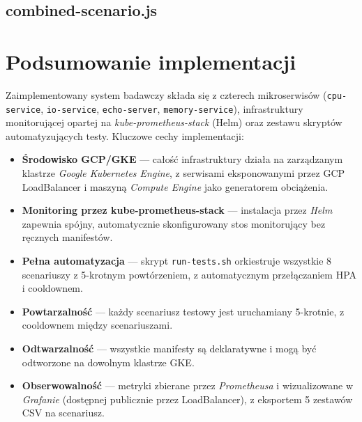 \subsection{combined-scenario.js}



\section{Podsumowanie implementacji}

Zaimplementowany system badawczy składa się z czterech mikroserwisów (\texttt{cpu-service}, \texttt{io-service}, \texttt{echo-server}, \texttt{memory-service}), infrastruktury monitorującej opartej na \textit{kube-prometheus-stack} (Helm) oraz zestawu skryptów automatyzujących testy. Kluczowe cechy implementacji:

\begin{itemize}
  \item \textbf{Środowisko GCP/GKE} — całość infrastruktury działa na zarządzanym klastrze \textit{Google Kubernetes Engine}, z serwisami eksponowanymi przez GCP LoadBalancer i maszyną \textit{Compute Engine} jako generatorem obciążenia.
  \item \textbf{Monitoring przez kube-prometheus-stack} — instalacja przez \textit{Helm} zapewnia spójny, automatycznie skonfigurowany stos monitorujący bez ręcznych manifestów.
  \item \textbf{Pełna automatyzacja} — skrypt \texttt{run-tests.sh} orkiestruje wszystkie 8 scenariuszy z 5-krotnym powtórzeniem, z automatycznym przełączaniem HPA i cooldownem.
  \item \textbf{Powtarzalność} — każdy scenariusz testowy jest uruchamiany 5-krotnie, z cooldownem między scenariuszami.
  \item \textbf{Odtwarzalność} — wszystkie manifesty są deklaratywne i mogą być odtworzone na dowolnym klastrze GKE.
  \item \textbf{Obserwowalność} — metryki zbierane przez \textit{Prometheusa} i wizualizowane w \textit{Grafanie} (dostępnej publicznie przez LoadBalancer), z eksportem 5 zestawów CSV na scenariusz.
\end{itemize}
